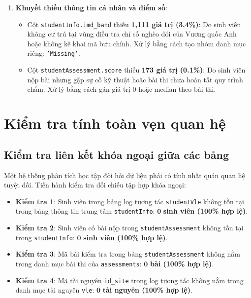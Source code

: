 \documentclass[11pt,a4paper]{article}
\begin{document}
\begin{enumerate}[leftmargin=*, itemsep=2pt, topsep=2pt]
    \pagebreak
    \item \textbf{Khuyết thiếu thông tin cá nhân và điểm số}:
    \begin{itemize}
        \item Cột \texttt{studentInfo.imd\_band} thiếu \textbf{1,111 giá trị (3.4\%)}: Do sinh viên không cư trú tại vùng điều tra chỉ số nghèo đói của Vương quốc Anh hoặc không kê khai mã bưu chính. Xử lý bằng cách tạo nhóm danh mục riêng: \texttt{'Missing'}.
        \item Cột \texttt{studentAssessment.score} thiếu \textbf{173 giá trị (0.1\%)}: Do sinh viên nộp bài nhưng gặp sự cố kỹ thuật hoặc bài thi chưa hoàn tất quy trình chấm. Xử lý bằng cách gán giá trị 0 hoặc median theo bài thi.
    \end{itemize}
\end{enumerate}

\section{Kiểm tra tính toàn vẹn quan hệ}

\subsection{Kiểm tra liên kết khóa ngoại giữa các bảng}

Một hệ thống phân tích học tập đòi hỏi dữ liệu phải có tính nhất quán quan hệ tuyệt đối. Tiến hành kiểm tra đối chiếu tập hợp khóa ngoại:
\begin{itemize}[leftmargin=*, itemsep=2pt, topsep=2pt]
    \item \textbf{Kiểm tra 1}: Sinh viên trong bảng log tương tác \texttt{studentVle} không tồn tại trong bảng thông tin trung tâm \texttt{studentInfo}: $\mathbf{0}$ \textbf{sinh viên (100\% hợp lệ)}.
    \item \textbf{Kiểm tra 2}: Sinh viên có bài nộp trong \texttt{studentAssessment} không tồn tại trong \texttt{studentInfo}: $\mathbf{0}$ \textbf{sinh viên (100\% hợp lệ)}.
    \item \textbf{Kiểm tra 3}: Mã bài kiểm tra trong bảng \texttt{studentAssessment} không nằm trong danh mục bài thi của \texttt{assessments}: $\mathbf{0}$ \textbf{bài (100\% hợp lệ)}.
    \item \textbf{Kiểm tra 4}: Mã tài nguyên \texttt{id\_site} trong log tương tác không nằm trong danh mục tài nguyên \texttt{vle}: $\mathbf{0}$ \textbf{tài nguyên (100\% hợp lệ)}.
\end{itemize}
\end{document}

